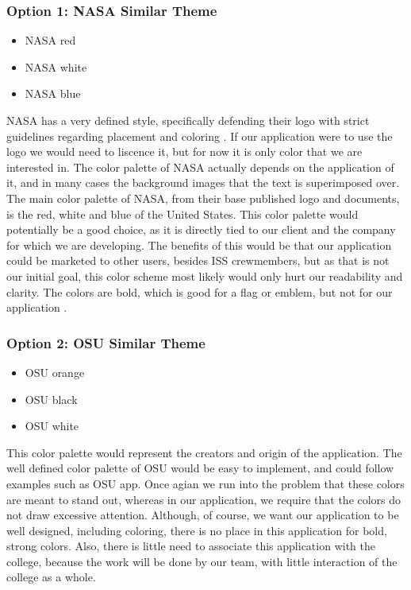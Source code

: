 \documentclass[onecolumn, draftclsnofoot,10pt, compsoc]{IEEEtran}
\begin{document}
\subsubsection{Option 1: NASA Similar Theme}
\begin{itemize}
  \item[\fcolorbox{black}{NASAred}{\rule{0pt}{6pt}\rule{6pt}{0pt}}\quad] NASA red
  \item[\fcolorbox{black}{white}{\rule{0pt}{6pt}\rule{6pt}{0pt}}\quad] NASA white
  \item[\fcolorbox{black}{NASAblue}{\rule{0pt}{6pt}\rule{6pt}{0pt}}\quad] NASA blue
\end{itemize}
NASA has a very defined style, specifically defending their logo with strict guidelines regarding placement and coloring \cite{nasa2}.
If our application were to use the logo we would need to liscence it, but for now it is only color that we are interested in.
The color palette of NASA actually depends on the application of it, and in many cases the background images that the text is superimposed over.
The main color palette of NASA, from their base published logo and documents, is the red, white and blue of the United States.
This color palette would potentially be a good choice, as it is directly tied to our client and the company for which we are developing.
The benefits of this would be that our application could be marketed to other users, besides ISS crewmembers, but as that is not our initial goal, this color scheme most likely would only hurt our readability and clarity.
The colors are bold, which is good for a flag or emblem, but not for our application \cite{nasa1}.

\subsubsection{Option 2: OSU Similar Theme}
\begin{itemize}
  \item[\fcolorbox{black}{OSUorange}{\rule{0pt}{6pt}\rule{6pt}{0pt}}\quad] OSU orange
  \item[\fcolorbox{black}{black}{\rule{0pt}{6pt}\rule{6pt}{0pt}}\quad] OSU black
  \item[\fcolorbox{black}{white}{\rule{0pt}{6pt}\rule{6pt}{0pt}}\quad] OSU white
\end{itemize}
This color palette would represent the creators and origin of the application.
The well defined color palette of OSU would be easy to implement, and could follow examples such as OSU app.
Once agian we run into the problem that these colors are meant to stand out, whereas in our application, we require that the colors do not draw excessive attention.
Although, of course, we want our application to be well designed, including coloring, there is no place in this application for bold, strong colors.
Also, there is little need to associate this application with the college, because the work will be done by our team, with little interaction of the college as a whole.
\end{document}
